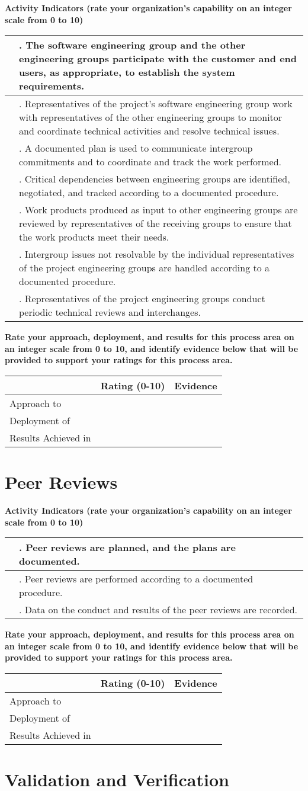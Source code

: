 \documentclass{article}
\renewcommand{\thesection}
{%
    KPA.%
    \ifnum \value{section}<10 0\fi%
    \arabic{section}%
}
\newcommand{\KPAname}{}
\newenvironment{KPARate}[1]
	{\renewcommand{\KPAname}{#1}
	 {\bf Rate your approach, deployment, and results for
	  this process area on an integer scale from 0 to 10, and 
	  identify evidence below that will be provided to support your
	  ratings for this process area.}
	 \begin{center}
	 \begin{tabular}{|p{1.0in}|p{0.5in}|p{5.0in}|} \hline
	 & Rating (0-10) & \multicolumn{1}{c|}{Evidence} \\ \hline}
	{\end{tabular}
	 \end{center}}
\newcommand{\Approach}[2]{Approach to \KPAname & #1 & #2 \\ \hline}
\newcommand{\Deployment}[2]{Deployment of \KPAname & #1 & #2 \\ \hline}
\newcommand{\Results}[2]{Results Achieved in \KPAname & #1 & #2 \\
	\hline}
\newcounter{activity}
\newenvironment{KPAActivity}
	{
	 \setcounter{activity}{0}
	 {\bf Activity Indicators (rate your organization's capability
	 on an integer scale from 0 to 10)}
	 \begin{center}
	 \begin{tabular}{|p{0.5in}|p{6.0in}|} \hline
	}
	{
	 \end{tabular}
	 \end{center}
	}
\newcommand{\Activity}[2]{\stepcounter{activity} #1 &
\arabic{activity}. #2 \\ \hline}
\begin{document}
\begin{KPAActivity}
\Activity{}{The software engineering group and the other engineering
groups participate with the customer and end users, as appropriate, to
establish the system requirements.}
\Activity{}{Representatives of the project's software engineering
group work with representatives of the other engineering groups to
monitor and coordinate technical activities and resolve technical
issues.}
\Activity{}{A documented plan is used to communicate intergroup
commitments and to coordinate and track the work performed.}
\Activity{}{Critical dependencies between engineering groups are
identified, negotiated, and tracked according to a documented
procedure.}
\Activity{}{Work products produced as input to other engineering groups
are reviewed by representatives of the receiving groups to ensure that
the work products meet their needs.}
\Activity{}{Intergroup issues not resolvable by the individual
representatives of the project engineering groups are handled
according to a documented procedure.}
\Activity{}{Representatives of the project engineering groups conduct
periodic technical reviews and interchanges.}
\end{KPAActivity}

\begin{KPARate}{Intergroup Coordination}
\Approach{}{}
\Deployment{}{}
\Results{}{}
\end{KPARate}

\newpage
\section{Peer Reviews}

\begin{KPAActivity}
\Activity{}{Peer reviews are planned, and the plans are documented.}
\Activity{}{Peer reviews are performed according to a documented
procedure.}
\Activity{}{Data on the conduct and results of the peer reviews are
recorded.} 
\end{KPAActivity}

\begin{KPARate}{Peer Reviews}
\Approach{}{}
\Deployment{}{}
\Results{}{}
\end{KPARate}

\newpage
\renewcommand{\thesection}{ASCI KPA}
\section{Validation and Verification}
\end{document}

